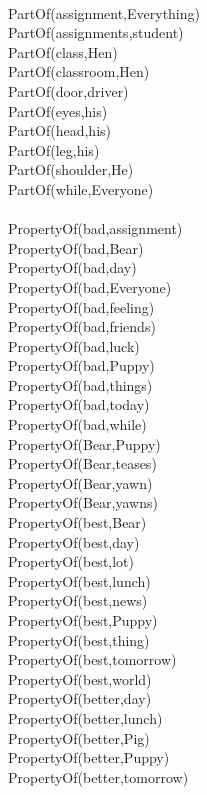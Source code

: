 \begin{multicols}{2}
\begin{footnotesize}
~\\
PartOf(assignment,Everything) \\
PartOf(assignments,student) \\
PartOf(class,Hen) \\
PartOf(classroom,Hen) \\
PartOf(door,driver) \\
PartOf(eyes,his) \\
PartOf(head,his) \\
PartOf(leg,his) \\
PartOf(shoulder,He) \\
PartOf(while,Everyone) \\
~\\
PropertyOf(bad,assignment) \\
PropertyOf(bad,Bear) \\
PropertyOf(bad,day) \\
PropertyOf(bad,Everyone) \\
PropertyOf(bad,feeling) \\
PropertyOf(bad,friends) \\
PropertyOf(bad,luck) \\
PropertyOf(bad,Puppy) \\
PropertyOf(bad,things) \\
PropertyOf(bad,today) \\
PropertyOf(bad,while) \\
PropertyOf(Bear,Puppy) \\
PropertyOf(Bear,teases) \\
PropertyOf(Bear,yawn) \\
PropertyOf(Bear,yawns) \\
PropertyOf(best,Bear) \\
PropertyOf(best,day) \\
PropertyOf(best,lot) \\
PropertyOf(best,lunch) \\
PropertyOf(best,news) \\
PropertyOf(best,Puppy) \\
PropertyOf(best,thing) \\
PropertyOf(best,tomorrow) \\
PropertyOf(best,world) \\
PropertyOf(better,day) \\
PropertyOf(better,lunch) \\
PropertyOf(better,Pig) \\
PropertyOf(better,Puppy) \\
PropertyOf(better,tomorrow) \\

\end{footnotesize}
\end{multicols}
